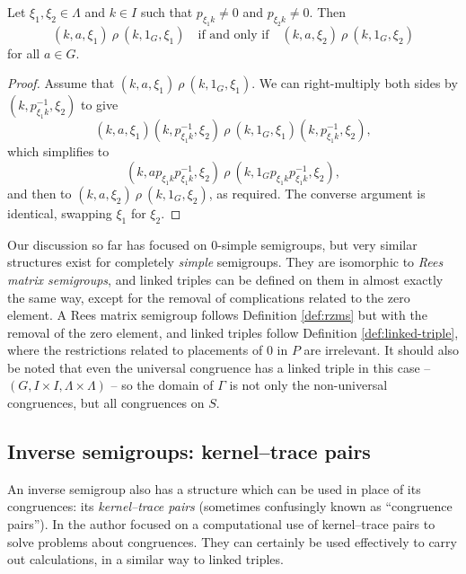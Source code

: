 \begin{lemma}
  Let $\xi_1, \xi_2 \in \Lambda$ and $k \in I$ such that $p_{\xi_1k}^{} \neq 0$
  and $p_{\xi_2 k}^{} \neq 0$.  Then
  $$(k, a, \xi_1) ~\rho~ (k, 1_G, \xi_1)
  \quad \text{if and only if} \quad
  (k, a, \xi_2) ~\rho~ (k, 1_G, \xi_2)$$
  for all $a \in G$.
  \begin{proof}
    Assume that $(k, a, \xi_1) ~\rho~ (k, 1_G, \xi_1)$.  We can right-multiply
    both sides by $(k, p_{\xi_1k}^{-1}, \xi_2)$ to give
    $$(k, a, \xi_1)(k, p_{\xi_1k}^{-1}, \xi_2)
    ~\rho~ (k, 1_G, \xi_1)(k, p_{\xi_1k}^{-1}, \xi_2),$$
    which simplifies to
    $$(k, a p_{\xi_1k}^{} p_{\xi_1k}^{-1}, \xi_2)
    ~\rho~ (k, 1_G p_{\xi_1k}^{} p_{\xi_1k}^{-1}, \xi_2),$$
    and then to
    $(k, a, \xi_2) ~\rho~ (k, 1_G, \xi_2)$,
    as required.
    The converse argument is identical, swapping $\xi_1$ for $\xi_2$.
  \end{proof}
\end{lemma}

Our discussion so far has focused on 0-simple semigroups, but very similar
structures exist for completely \textit{simple} semigroups.  They are isomorphic
to \textit{Rees matrix semigroups}, and linked triples can be defined on them in
almost exactly the same way, except for the removal of complications related to
the zero element.  A Rees matrix semigroup follows Definition \ref{def:rzms} but
with the removal of the zero element, and linked triples follow Definition
\ref{def:linked-triple}, where the restrictions related to placements of $0$ in
$P$ are irrelevant.  It should also be noted that even the universal congruence
has a linked triple in this
case -- $(G, I \times I, \Lambda \times \Lambda)$ -- so the domain of $\Gamma$ is
not only the non-universal congruences, but all congruences on $S$.

\subsection{Inverse semigroups: kernel--trace pairs}
\label{sec:kertr}

An inverse semigroup also has a structure which can be used in place of its
congruences: its \textit{kernel--trace pairs} (sometimes confusingly known as
``congruence pairs'').  In \cite[Chapter 5]{mtorpey_msc} the author focused on a
computational use of kernel--trace pairs to solve problems about congruences.
They can certainly be used effectively to carry out calculations, in a similar
way to linked triples.

